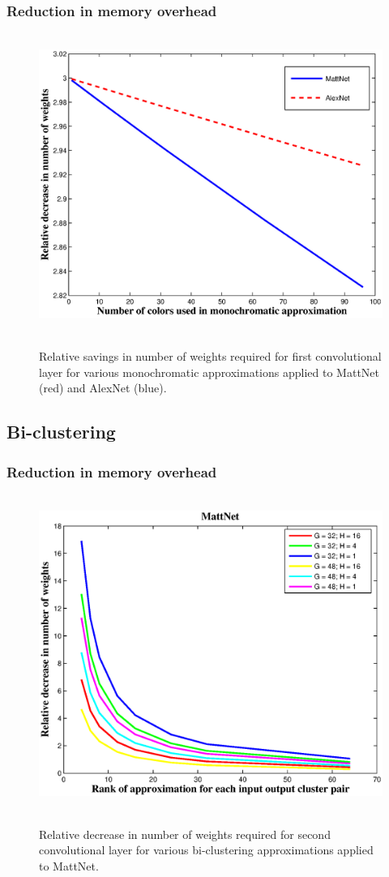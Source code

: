 \subsubsection{Reduction in memory overhead}
\begin{figure}[t]
\centering
\mbox{
  \includegraphics[width=0.75\linewidth]{img/monochromatic_numcolors_vs_numweights.eps} 
}
\label{monochromatic_numweights}
\caption{Relative savings in number of weights required for first convolutional layer for various monochromatic approximations applied to MattNet (red) and AlexNet (blue).}
\end{figure}

\subsection{Bi-clustering}

\subsubsection{Reduction in memory overhead}
\begin{figure}[t]
\centering
\mbox{
  \includegraphics[width=0.75\linewidth]{img/biclustering_rank_vs_numweights_matt.eps} 
}
\label{biclustering_numweights}
\caption{Relative decrease in number of weights required for second convolutional layer for various bi-clustering approximations applied to MattNet.}
\end{figure}

